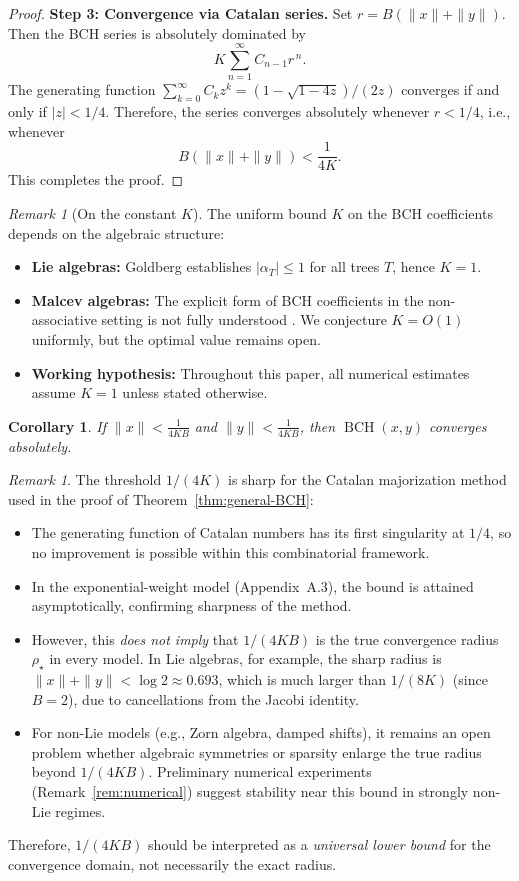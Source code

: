 \documentclass[11pt]{amsart}
\numberwithin{equation}{section}
\newtheorem{corollary}[theorem]{Corollary}
\theoremstyle{remark}
\newtheorem{remark}[theorem]{Remark}
\newcommand{\BCH}{\operatorname{BCH}}
\begin{document}
\begin{proof}
\medskip

\noindent\textbf{Step 3: Convergence via Catalan series.}
Set $r = B(\|x\| + \|y\|)$. Then the BCH series is absolutely dominated by
\[
K \sum_{n=1}^\infty C_{n-1} r^{\,n}.
\]
The generating function $\sum_{k=0}^\infty C_k z^k = (1 - \sqrt{1 - 4z})/(2z)$ converges if and only if $|z| < 1/4$. Therefore, the series converges absolutely whenever $r < 1/4$, i.e., whenever
\[
B(\|x\| + \|y\|) < \frac{1}{4K}.
\]
This completes the proof.
\end{proof}
\begin{remark}[On the constant $K$]
\label{rem:value-K}
The uniform bound $K$ on the BCH coefficients depends on the 
algebraic structure:
\begin{itemize}
\item \textbf{Lie algebras:} Goldberg \cite{Goldberg1956} 
  establishes $|\alpha_T| \leq 1$ for all trees $T$, 
  hence $K = 1$.
\item \textbf{Malcev algebras:} The explicit form of BCH 
  coefficients in the non-associative setting is not fully 
  understood \cite{Mostovoy2016}. We conjecture $K = O(1)$ 
  uniformly, but the optimal value remains open.
\item \textbf{Working hypothesis:} Throughout this paper, 
  all numerical estimates assume $K = 1$ unless stated 
  otherwise.
\end{itemize}
\end{remark}
\begin{corollary}
If $\|x\| < \frac{1}{4KB}$ and $\|y\| < \frac{1}{4KB}$, then $\BCH(x,y)$ converges absolutely.
\end{corollary}

\begin{remark}\label{rem:sharpness-and-optimal}
The threshold $1/(4K)$ is sharp for the Catalan majorization method used in the proof of Theorem~\ref{thm:general-BCH}:\begin{itemize}
\item The generating function of Catalan numbers has its first singularity at $1/4$, so no improvement is possible within this combinatorial framework.
\item In the exponential-weight model (Appendix~A.3), the bound is attained asymptotically, confirming sharpness of the method.
\item However, this \emph{does not imply} that $1/(4KB)$ is the true convergence radius $\rho_\star$ in every model. In Lie algebras, for example, the sharp radius is $\|x\| + \|y\| < \log 2 \approx 0.693$, which is much larger than $1/(8K)$ (since $B=2$), due to cancellations from the Jacobi identity.
\item For non-Lie models (e.g., Zorn algebra, damped shifts), it remains an open problem whether algebraic symmetries or sparsity enlarge the true radius beyond $1/(4KB)$. Preliminary numerical experiments (Remark~\ref{rem:numerical}) suggest stability near this bound in strongly non-Lie regimes.\end{itemize}
Therefore, $1/(4KB)$ should be interpreted as a \emph{universal lower bound} for the convergence domain, not necessarily the exact radius.
\end{remark}
\end{document}
